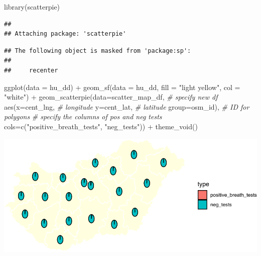 \documentclass[
]{book}
\newenvironment{Shaded}{\begin{snugshade}}{\end{snugshade}}
\newcommand{\AttributeTok}[1]{\textcolor[rgb]{0.77,0.63,0.00}{#1}}
\newcommand{\CommentTok}[1]{\textcolor[rgb]{0.56,0.35,0.01}{\textit{#1}}}
\newcommand{\FunctionTok}[1]{\textcolor[rgb]{0.00,0.00,0.00}{#1}}
\newcommand{\NormalTok}[1]{#1}
\newcommand{\SpecialCharTok}[1]{\textcolor[rgb]{0.00,0.00,0.00}{#1}}
\newcommand{\StringTok}[1]{\textcolor[rgb]{0.31,0.60,0.02}{#1}}
\begin{document}
\begin{Shaded}
\begin{Highlighting}[]
\FunctionTok{library}\NormalTok{(scatterpie)}
\end{Highlighting}
\end{Shaded}

\begin{verbatim}
## 
## Attaching package: 'scatterpie'
\end{verbatim}

\begin{verbatim}
## The following object is masked from 'package:sp':
## 
##     recenter
\end{verbatim}

\begin{Shaded}
\begin{Highlighting}[]
\FunctionTok{ggplot}\NormalTok{(}\AttributeTok{data =}\NormalTok{ hu\_dd) }\SpecialCharTok{+} 
  \FunctionTok{geom\_sf}\NormalTok{(}\AttributeTok{data =}\NormalTok{ hu\_dd, }
          \AttributeTok{fill =} \StringTok{"light yellow"}\NormalTok{, }
          \AttributeTok{col =} \StringTok{"white"}\NormalTok{) }\SpecialCharTok{+} 
  \FunctionTok{geom\_scatterpie}\NormalTok{(}\AttributeTok{data=}\NormalTok{scatter\_map\_df,   }\CommentTok{\# specify new df}
                  \FunctionTok{aes}\NormalTok{(}\AttributeTok{x=}\NormalTok{cent\_lng,        }\CommentTok{\# longitude}
                      \AttributeTok{y=}\NormalTok{cent\_lat,        }\CommentTok{\# latitude}
                      \AttributeTok{group=}\NormalTok{osm\_id),     }\CommentTok{\# ID for polygons}
                  \CommentTok{\# specify the columns of pos and neg tests}
                  \AttributeTok{cols=}\FunctionTok{c}\NormalTok{(}\StringTok{"positive\_breath\_tests"}\NormalTok{, }\StringTok{"neg\_tests"}\NormalTok{)) }\SpecialCharTok{+} 
  \FunctionTok{theme\_void}\NormalTok{()}
\end{Highlighting}
\end{Shaded}

\includegraphics{crime_mapping_files/figure-latex/unnamed-chunk-156-1.pdf}
\end{document}
